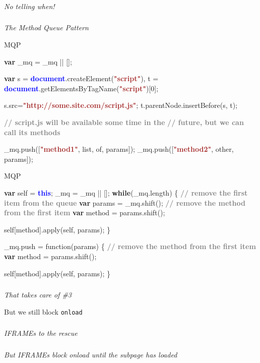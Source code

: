 \documentclass{beamer}
\newcommand{\innersplash}[1]{
  \begin{center}
    \Large \textrm{\textit{ #1 } }
  \end{center}
}
\newcommand{\splashslide}[2][{}]{
  \begin{frame}
  \frametitle{#1}
  \innersplash{#2}
  \end{frame}
}
\def\gray<#1>#2{\textcolor<#1>{gray}{\textbf<#1>{#2}}}
\def\brown<#1>#2{\textcolor<#1>{brown}{\textbf<#1>{#2}}}
\def\green<#1>#2{\textcolor<#1>{dark-green}{\textbf<#1>{#2}}}
\def\blue<#1>#2{\textcolor<#1>{blue}{\textbf<#1>{#2}}}
\begin{document}
\splashslide{No telling when!}

\splashslide{The Method Queue Pattern}

\begin{frame}[fragile]{MQP}
\begin{semiverbatim}
\green<1>{var} \_mq = \_mq || [];

\green<1>{var} s = \blue<1>{document}.createElement(\brown<1>{"script"}),
    t = \blue<1>{document}.getElementsByTagName(\brown<1>{"script"})[0];

s.src=\brown<1>{"http://some.site.com/script.js"};
t.parentNode.insertBefore(s, t);

\gray<1>{// script.js will be available some time in the}
\gray<1>{// future, but we can call its methods}

\_mq.push([\brown<1>{"method1"}, list, of, params]);
\_mq.push([\brown<1>{"method2"}, other, params]);
\end{semiverbatim}
\end{frame}

\begin{frame}[fragile]{MQP}
\begin{semiverbatim}
\green<1>{var} self = \blue<1>{this};
\_mq = \_mq || [];
\green<1>{while}(\_mq.length) \{
    \gray<1>{// remove the first item from the queue}
    \green<1>{var} params = \_mq.shift();
    \gray<1>{// remove the method from the first item}
    \green<1>{var} method = params.shift();

    self[method].apply(self, params);
\}

\_mq.push = function(params) \{
    \gray<1>{// remove the method from the first item}
    \green<1>{var} method = params.shift();

    self[method].apply(self, params);
\}
\end{semiverbatim}
\end{frame}

\splashslide{That takes care of \#3}

\begin{frame}{But we still block \texttt{onload}}
\end{frame}

\splashslide{IFRAMEs to the rescue}

\splashslide{But IFRAMEs block onload until the subpage has loaded}
\end{document}
